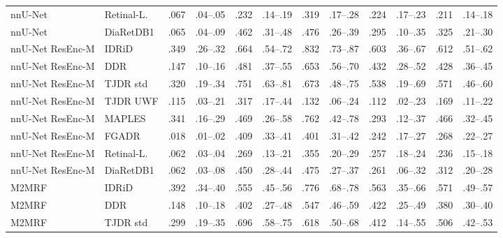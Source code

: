 \begin{landscape}
{\begin{longtable}{l l c c c c c c c c c c}
nnU-Net & Retinal-L. & .067 & \scriptsize .04--.05 & .232 & \scriptsize .14--.19 & .319 & \scriptsize .17--.28 & .224 & \scriptsize .17--.23 & .211 & \scriptsize .14--.18 \\
nnU-Net & DiaRetDB1 & .065 & \scriptsize .04--.09 & .462 & \scriptsize .31--.48 & .476 & \scriptsize .26--.39 & .295 & \scriptsize .10--.35 & .325 & \scriptsize .21--.30 \\
nnU-Net ResEnc-M & IDRiD & .349 & \scriptsize .26--.32 & .664 & \scriptsize .54--.72 & .832 & \scriptsize .73--.87 & .603 & \scriptsize .36--.67 & .612 & \scriptsize .51--.62 \\
nnU-Net ResEnc-M & DDR & .147 & \scriptsize .10--.16 & .481 & \scriptsize .37--.55 & .653 & \scriptsize .56--.70 & .432 & \scriptsize .28--.52 & .428 & \scriptsize .36--.45 \\
nnU-Net ResEnc-M & TJDR std & .320 & \scriptsize .19--.34 & .751 & \scriptsize .63--.81 & .673 & \scriptsize .48--.75 & .538 & \scriptsize .19--.69 & .571 & \scriptsize .46--.60 \\
nnU-Net ResEnc-M & TJDR UWF & .115 & \scriptsize .03--.21 & .317 & \scriptsize .17--.44 & .132 & \scriptsize .06--.24 & .112 & \scriptsize .02--.23 & .169 & \scriptsize .11--.22 \\
nnU-Net ResEnc-M & MAPLES & .341 & \scriptsize .16--.29 & .469 & \scriptsize .26--.58 & .762 & \scriptsize .42--.78 & .293 & \scriptsize .12--.37 & .466 & \scriptsize .32--.45 \\
nnU-Net ResEnc-M & FGADR & .018 & \scriptsize .01--.02 & .409 & \scriptsize .33--.41 & .401 & \scriptsize .31--.42 & .242 & \scriptsize .17--.27 & .268 & \scriptsize .22--.27 \\
nnU-Net ResEnc-M & Retinal-L. & .062 & \scriptsize .03--.04 & .269 & \scriptsize .13--.21 & .355 & \scriptsize .20--.29 & .257 & \scriptsize .18--.24 & .236 & \scriptsize .15--.18 \\
nnU-Net ResEnc-M & DiaRetDB1 & .062 & \scriptsize .03--.08 & .450 & \scriptsize .28--.44 & .475 & \scriptsize .27--.37 & .261 & \scriptsize .06--.32 & .312 & \scriptsize .20--.28 \\
M2MRF & IDRiD & .392 & \scriptsize .34--.40 & .555 & \scriptsize .45--.56 & .776 & \scriptsize .68--.78 & .563 & \scriptsize .35--.66 & .571 & \scriptsize .49--.57 \\
M2MRF & DDR & .148 & \scriptsize .10--.18 & .402 & \scriptsize .27--.48 & .547 & \scriptsize .46--.59 & .422 & \scriptsize .25--.49 & .380 & \scriptsize .30--.40 \\
M2MRF & TJDR std & .299 & \scriptsize .19--.35 & .696 & \scriptsize .58--.75 & .618 & \scriptsize .50--.68 & .412 & \scriptsize .14--.55 & .506 & \scriptsize .42--.53 \\

\end{longtable}}
\end{landscape}
